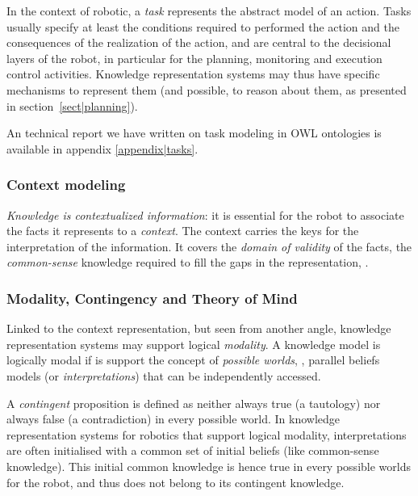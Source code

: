 In the context of robotic, a \emph{task} represents the abstract model of an
action. Tasks usually specify at least the conditions required to performed the
action and the consequences of the realization of the action, and are central
to the decisional layers of the robot, in particular for the planning,
monitoring and execution control activities. Knowledge representation systems
may thus have specific mechanisms to represent them (and possible, to reason
about them, as presented in section~\ref{sect|planning}).

An technical report we have written on task modeling in OWL ontologies is
available in appendix \ref{appendix|tasks}.




\subsubsection{Context modeling}

\emph{Knowledge is contextualized information}: it is essential for the robot to associate the facts it
represents to a \emph{context}. The context carries the keys for the
interpretation of the information. It covers the \emph{domain of validity} of
the facts, the \emph{common-sense} knowledge required to fill the gaps in the
representation, .

\subsubsection{Modality, Contingency and Theory of Mind}
\label{sect|possible-worlds}

Linked to the context representation, but seen from another angle, knowledge
representation systems may support logical \emph{modality}. A knowledge model
is logically modal if is support the concept of \emph{possible worlds}, \ie,
parallel beliefs models (or \emph{interpretations}) that can be independently
accessed.

A \emph{contingent} proposition is defined as neither always true (a tautology)
nor always false (a contradiction) in every possible world. In knowledge
representation systems for robotics that support logical modality,
interpretations are often initialised with a common set of initial beliefs
(like common-sense knowledge). This initial common knowledge is hence true in
every possible worlds for the robot, and thus does not belong to its contingent
knowledge.

